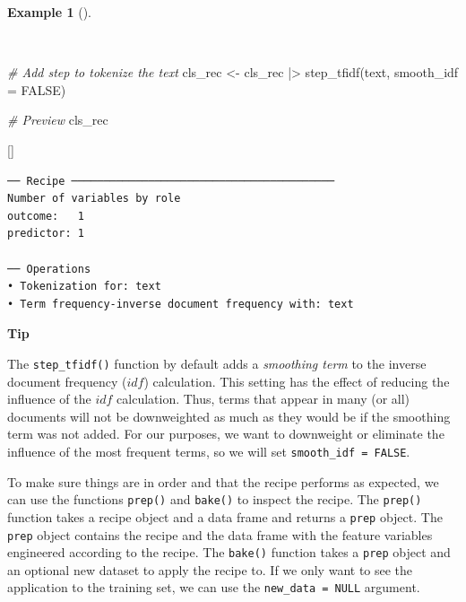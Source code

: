 \documentclass[
  letterpaper,
  krantz1]{latex/krantz-mod}
\newenvironment{Shaded}{\begin{snugshade}}{\end{snugshade}}
\newcommand{\AttributeTok}[1]{\textcolor[rgb]{0.00,0.00,0.00}{#1}}
\newcommand{\CommentTok}[1]{\textcolor[rgb]{0.00,0.00,0.00}{\textit{#1}}}
\newcommand{\ConstantTok}[1]{\textcolor[rgb]{0.00,0.00,0.00}{#1}}
\newcommand{\FunctionTok}[1]{\textcolor[rgb]{0.00,0.00,0.00}{#1}}
\newcommand{\NormalTok}[1]{\textcolor[rgb]{0.00,0.00,0.00}{#1}}
\newcommand{\OtherTok}[1]{\textcolor[rgb]{0.00,0.00,0.00}{#1}}
\newcommand{\SpecialCharTok}[1]{\textcolor[rgb]{0.00,0.00,0.00}{#1}}
\newcommand{\cindex}[1]{%
  \StrSubstitute{#1}{_}{\_}[\temp]%
  \index{\temp}%
}
\theoremstyle{definition}
\theoremstyle{definition}
\newtheorem{example}{Example}[chapter]
\theoremstyle{remark}
\begin{document}
\begin{example}[]\protect\hypertarget{exm-predict-class-recipe-tfidf}{}\label{exm-predict-class-recipe-tfidf}

~

\begin{Shaded}
\begin{Highlighting}[numbers=left,,]
\CommentTok{\# Add step to tokenize the text}
\NormalTok{cls\_rec }\OtherTok{\textless{}{-}}
\NormalTok{  cls\_rec }\SpecialCharTok{|\textgreater{}}
  \FunctionTok{step\_tfidf}\NormalTok{(text, }\AttributeTok{smooth\_idf =} \ConstantTok{FALSE}\NormalTok{)}

\CommentTok{\# Preview}
\NormalTok{cls\_rec}
\end{Highlighting}
\end{Shaded}

 \cindex{step_tfidf()}

\begin{verbatim}
── Recipe ─────────────────────────────────────────
Number of variables by role
outcome:   1
predictor: 1

── Operations
• Tokenization for: text
• Term frequency-inverse document frequency with: text
\end{verbatim}

\end{example}

\pagebreak

\begin{tcolorbox}[enhanced jigsaw, toprule=.15mm, breakable, colback=white, arc=.35mm, left=2mm, colframe=quarto-callout-color-frame, opacityback=0, bottomrule=.15mm, rightrule=.15mm, leftrule=.75mm]

\textbf{ Tip}

The \texttt{step\_tfidf()} function by default adds a \emph{smoothing
term} to the inverse document frequency (\(idf\))
calculation. This setting has the
effect of reducing the influence of the \(idf\) calculation. Thus, terms
that appear in many (or all) documents will not be downweighted as much
as they would be if the smoothing term was not added. For our purposes,
we want to downweight or eliminate the influence of the most frequent
terms, so we will set \texttt{smooth\_idf\ =\ FALSE}.

\end{tcolorbox}

To make sure things are in order and that the recipe performs as
expected, we can use the functions \texttt{prep()} and \texttt{bake()}
to inspect the recipe. The \texttt{prep()} function takes a recipe
object and a data frame and returns a \texttt{prep} object. The
\texttt{prep} object contains the recipe and the data frame with the
feature variables engineered according to the recipe. The
\texttt{bake()} function takes a \texttt{prep} object and an optional
new dataset to apply the recipe to. If we only want to see the
application to the training set, we can use the
\texttt{new\_data\ =\ NULL} argument.
\end{document}
